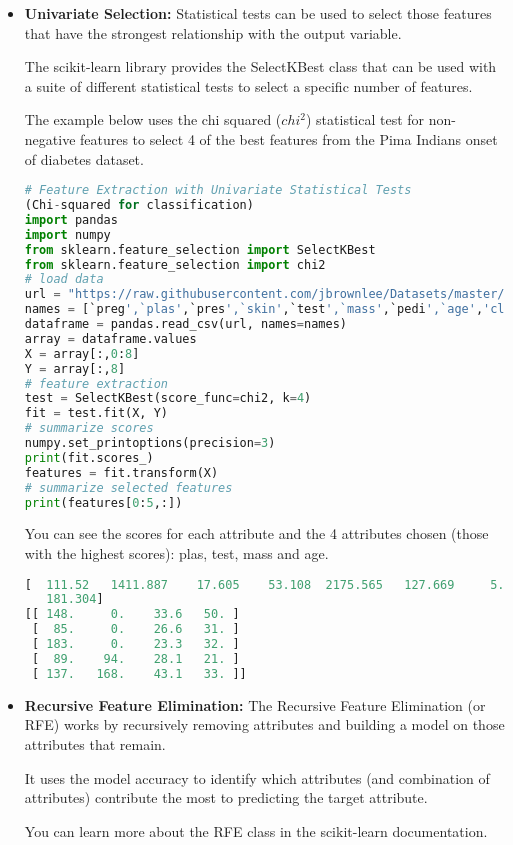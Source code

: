 \documentclass{book}
\begin{document}
\begin{itemize}
\item \textbf{Univariate Selection:}
Statistical tests can be used to select those features that have the strongest relationship with the output variable.

The scikit-learn library provides the SelectKBest class that can be used with a suite of different statistical tests to select a specific number of features.

The example below uses the chi squared ($chi^2$) statistical test for non-negative features to select 4 of the best features from the Pima Indians onset of diabetes dataset.
\begin{lstlisting}[language=Python]
# Feature Extraction with Univariate Statistical Tests 
(Chi-squared for classification)
import pandas
import numpy
from sklearn.feature_selection import SelectKBest
from sklearn.feature_selection import chi2
# load data
url = "https://raw.githubusercontent.com/jbrownlee/Datasets/master/pima-indians-diabetes.data.csv"
names = [`preg',`plas',`pres',`skin',`test',`mass',`pedi',`age','class']
dataframe = pandas.read_csv(url, names=names)
array = dataframe.values
X = array[:,0:8]
Y = array[:,8]
# feature extraction
test = SelectKBest(score_func=chi2, k=4)
fit = test.fit(X, Y)
# summarize scores
numpy.set_printoptions(precision=3)
print(fit.scores_)
features = fit.transform(X)
# summarize selected features
print(features[0:5,:])
\end{lstlisting}
You can see the scores for each attribute and the 4 attributes chosen (those with the highest scores): plas, test, mass and age.
\begin{lstlisting}[language=Python]
[  111.52   1411.887    17.605    53.108  2175.565   127.669     5.393
   181.304]
[[ 148.     0.    33.6   50. ]
 [  85.     0.    26.6   31. ]
 [ 183.     0.    23.3   32. ]
 [  89.    94.    28.1   21. ]
 [ 137.   168.    43.1   33. ]]
\end{lstlisting}
\item \textbf{Recursive Feature Elimination:}
The Recursive Feature Elimination (or RFE) works by recursively removing attributes and building a model on those attributes that remain.

It uses the model accuracy to identify which attributes (and combination of attributes) contribute the most to predicting the target attribute.

You can learn more about the RFE class in the scikit-learn documentation.


\end{itemize}
\end{document}
